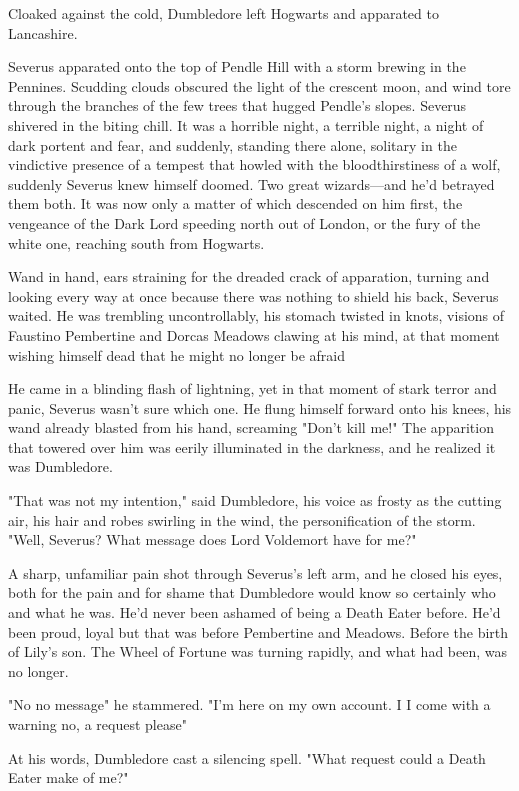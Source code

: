 Cloaked against the cold, Dumbledore left Hogwarts and apparated to Lancashire.

Severus apparated onto the top of Pendle Hill with a storm brewing in the Pennines. Scudding clouds obscured the light of the crescent moon, and wind tore through the branches of the few trees that hugged Pendle's slopes. Severus shivered in the biting chill. It was a horrible night, a terrible night, a night of dark portent and fear, and suddenly, standing there alone, solitary in the vindictive presence of a tempest that howled with the bloodthirstiness of a wolf, suddenly Severus knew himself doomed. Two great wizards—and he'd betrayed them both. It was now only a matter of which descended on him first, the vengeance of the Dark Lord speeding north out of London, or the fury of the white one, reaching south from Hogwarts.

Wand in hand, ears straining for the dreaded crack of apparation, turning and looking every way at once because there was nothing to shield his back, Severus waited. He was trembling uncontrollably, his stomach twisted in knots, visions of Faustino Pembertine and Dorcas Meadows clawing at his mind, at that moment wishing himself dead that he might no longer be afraid{\el}

He came in a blinding flash of lightning, yet in that moment of stark terror and panic, Severus wasn't sure which one. He flung himself forward onto his knees, his wand already blasted from his hand, screaming "Don't kill me!" The apparition that towered over him was eerily illuminated in the darkness, and he realized it was Dumbledore.

"That was not my intention," said Dumbledore, his voice as frosty as the cutting air, his hair and robes swirling in the wind, the personification of the storm. "Well, Severus? What message does Lord Voldemort have for me?"

A sharp, unfamiliar pain shot through Severus's left arm, and he closed his eyes, both for the pain and for shame that Dumbledore would know so certainly who and what he was. He'd never been ashamed of being a Death Eater before. He'd been proud, loyal{\el} but that was before Pembertine and Meadows. Before the birth of Lily's son. The Wheel of Fortune was turning rapidly, and what had been, was no longer.

"No{\el} no message{\el}" he stammered. "I'm here on my own account. I{\el} I come with a warning{\el} no, a request{\el} please{\el}"

At his words, Dumbledore cast a silencing spell. "What request could a Death Eater make of me?"

